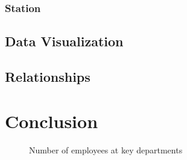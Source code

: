 \documentclass{article}
\begin{document}
        \subsubsection{Station}
        


    \subsection{Data Visualization}

    \subsection{Relationships}

\section{Conclusion}

\newpage

\begin{figure}
    \caption{Number of employees at key departments}
    \label{simpleagency}
\end{figure}

\newpage
\end{document}

